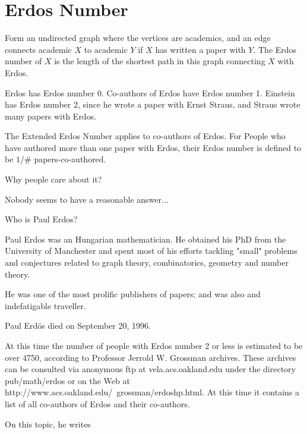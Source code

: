 \section{Erdos Number}

    Form an undirected graph where the vertices are academics, and an
    edge connects academic $X$ to academic $Y$ if $X$ has written a paper
    with $Y$. The Erdos number of $X$ is the length of the shortest path
    in this graph connecting $X$ with Erdos.

    Erdos has Erdos number 0.  Co-authors of Erdos have Erdos number 1.
    Einstein has Erdos number 2, since he wrote a paper with Ernst Straus,
    and Straus wrote many papers with Erdos.


    The Extended Erdos Number applies to co-authors of Erdos.
    For People who have authored more than one paper with Erdos,
    their Erdos number is defined to be $1/\#$ papers-co-authored.

    Why people care about it?

     Nobody seems to have a reasonable answer...

    Who is Paul Erdos?

    Paul Erdos was an Hungarian mathematician. He obtained his PhD
    from the University of Manchester and spent most of his
    efforts tackling "small" problems and conjectures related to
    graph theory, combinatorics, geometry and number theory.

    He was one of the most prolific publishers of papers; and was
    also and indefatigable traveller.

    Paul Erd\"os died on September 20, 1996.

    At this time the number of people with Erdos number 2 or less
    is estimated to be over 4750, according to Professor Jerrold
    W. Grossman archives. These archives can be consulted via
    anonymous ftp at vela.acs.oakland.edu under the directory
    pub/math/erdos or on the Web at http://www.acs.oakland.edu/~grossman/erdoshp.html.
    At this time it contains a list of all co-authors
    of Erdos and their co-authors.

    On this topic, he writes

